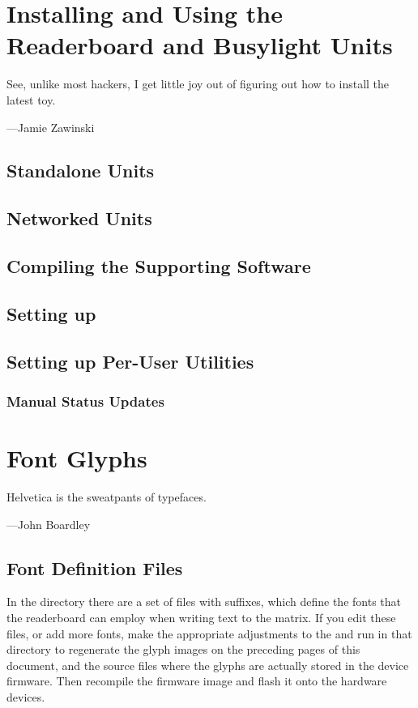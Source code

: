 \chapter{Installing and Using the Readerboard and Busylight Units}
\epigraph{See, unlike most hackers, I get little joy out of figuring out how to install the latest toy.}{---Jamie Zawinski}
\section{Standalone Units}
\section{Networked Units}
\section{Compiling the Supporting Software}
\section{Setting up }
\section{Setting up Per-User Utilities}
\subsection{}
\subsection{}
\subsection{Manual Status Updates}

%                               
\chapter{Font Glyphs}\label{chap:fonts}
\epigraph{Helvetica is the sweatpants of typefaces.}{---John Boardley}

\section{Font Definition Files}
In the  directory there are a set of files with  suffixes,
which define the fonts that the readerboard can employ when writing text to the matrix.
If you edit these files, or add more fonts, make the appropriate adjustments to the
 and run  in that directory to regenerate the glyph images on the
preceding pages of this document, and the source files where the glyphs are actually
stored in the device firmware. Then recompile the firmware image and flash it onto
the hardware devices.

